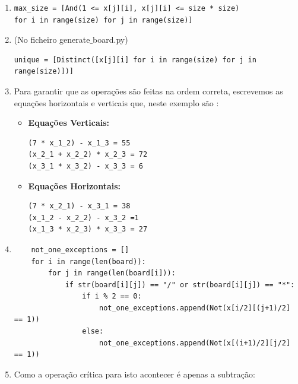 \documentclass{article}
\begin{document}
 \begin{enumerate}
 \item 
\begin{verbatim}
max_size = [And(1 <= x[j][i], x[j][i] <= size * size) 
for i in range(size) for j in range(size)]
\end{verbatim}

 \item \small{(No ficheiro generate$\_$board.py)}

\begin{verbatim}
unique = [Distinct([x[j][i] for i in range(size) for j in range(size)])]
\end{verbatim}

 \item Para garantir que as operações são feitas na ordem correta, escrevemos as equações horizontais e verticais que, neste exemplo são : \\
\begin{itemize}
\item {\bf{Equações Verticais:}}
\begin{verbatim}
(7 * x_1_2) - x_1_3 = 55
(x_2_1 + x_2_2) * x_2_3 = 72
(x_3_1 * x_3_2) - x_3_3 = 6
\end{verbatim}
\item {\bf{Equações Horizontais:}}
\begin{verbatim}
(7 * x_2_1) - x_3_1 = 38
(x_1_2 - x_2_2) - x_3_2 =1
(x_1_3 * x_2_3) * x_3_3 = 27
\end{verbatim}
\end{itemize}

\item 
\small{
\begin{verbatim}
    not_one_exceptions = []
    for i in range(len(board)):
        for j in range(len(board[i])):
            if str(board[i][j]) == "/" or str(board[i][j]) == "*":
                if i % 2 == 0:
                    not_one_exceptions.append(Not(x[i/2][(j+1)/2] == 1))
                else:
                    not_one_exceptions.append(Not(x[(i+1)/2][j/2] == 1))
\end{verbatim}
}

\item Como a operação crítica para isto acontecer é apenas a subtração: 


\end{enumerate}
\end{document}
